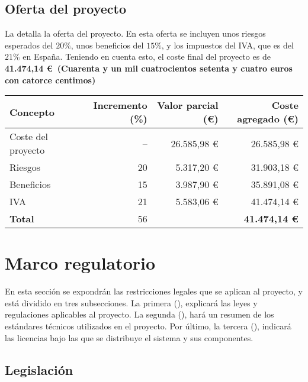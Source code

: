 \subsection{Oferta del proyecto}\label{subsec:offer}

La  detalla la oferta del proyecto. En esta oferta se
incluyen unos riesgos esperados del $20 \%$, unos beneficios del $15 \%$, y los
impuestos del IVA, que es del $21 \%$ en España. Teniendo en cuenta esto, el
coste final del proyecto es de \textbf{41.474,14 \euro~(Cuarenta y un mil
cuatrocientos setenta y cuatro euros con catorce centimos)}

\begin{table}[htb]
    {
      \begin{tabular}{lrrr}
        \toprule
        \textbf{Concepto} & \textbf{Incremento (\%)} & \textbf{Valor parcial (\euro)} & \textbf{Coste agregado (\euro)} \\
        \midrule
        Coste del proyecto & -- & 26.585,98 \euro & 26.585,98 \euro \\
        Riesgos            & 20 &  5.317,20 \euro & 31.903,18 \euro \\
        Beneficios         & 15 &  3.987,90 \euro & 35.891,08 \euro \\
        IVA                & 21 &  5.583,06 \euro & 41.474,14 \euro \\
        \midrule
        \textbf{Total}     & 56 &                 & \textbf{41.474,14 \euro} \\
        \bottomrule
      \end{tabular}
    }
\end{table}

\section{Marco regulatorio}

En esta sección se expondrán las restricciones legales que se aplican al
proyecto, y está dividido en tres subsecciones. La primera
(), explicará las leyes y regulaciones aplicables al
proyecto. La segunda (), hará un resumen de los
estándares técnicos utilizados en el proyecto. Por último, la tercera
(), indicará las licencias bajo las que se distribuye el
sistema y sus componentes.

\subsection{Legislación}\label{subsec:legislation}


